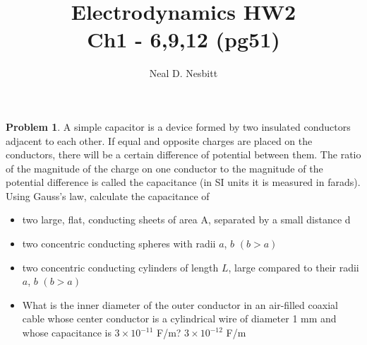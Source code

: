 \documentclass{article}
\title{Electrodynamics HW2\\
Ch1 - 6,9,12 (pg51)}
\author{Neal D. Nesbitt}
\begin{document}
\maketitle

\theoremstyle{definition}
\newtheorem{problem}{Problem}

\setcounter{problem}{5}
\begin{problem}
	A simple capacitor is a device formed by two insulated conductors adjacent to each other. If equal and opposite charges are placed on the conductors, there will be a certain difference of potential between them. The ratio of the magnitude of the charge on one conductor to the magnitude of the potential difference is called the capacitance (in SI units it is measured in farads). Using Gauss's law, calculate the capacitance of
	\begin{itemize}
		\item two large, flat, conducting sheets of area A, separated by a small distance d
		\item two concentric conducting spheres with radii $a$, $b$ $(b>a)$
		\item two concentric conducting cylinders of length $L$, large compared to their radii $a$, $b$ $(b>a)$
		\item What is the inner diameter of the outer conductor in an air-filled coaxial cable whose center conductor is a cylindrical wire of diameter 1 mm and whose capacitance is $3\times 10^{-11}$ F/m? $3\times 10^{-12}$ F/m
	\end{itemize}
\end{problem}
\end{document}
